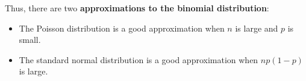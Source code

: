 \begin{paracol}{2}


\switchcolumn

Thus, there are two \textbf{approximations to the binomial distribution}:

\begin{itemize}
    \item The Poisson distribution is a good approximation when $n$ is large and $p$ is small.

    \item The standard normal distribution is a good approximation when $np (1-p)$ is large.
\end{itemize}

\end{paracol}
